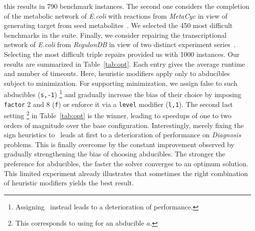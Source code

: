 this results in 790 benchmark instances.
The second one considers the completion of the metabolic network of \emph{E.coli} with reactions from \textit{MetaCyc} in view of generating target from seed metabolites~\cite{schthi09a}.
We selected the 450 most difficult benchmarks in the suite.
Finally, we consider repairing the transcriptional network of \emph{E.coli} from \textit{RegulonDB} in view of two distinct experiment series~\cite{geguivscsithve10a}.
Selecting the most difficult triple repairs provided us with 1000 instances.
%
Our results are summarized in Table~\ref{tab:opt}.
Each entry gives the average runtime and number of timeouts.
%
Here, heuristic modifiers apply only to abducibles subject to minimization.
%
For supporting minimization,
we assign false to such abducibles (\texttt{s,-1})%
\footnote{Assigning \true\ instead leads to a deterioration of performance.}
and gradually increase the bias of their choice by imposing \texttt{factor} 2 and 8 (\texttt{f})
or enforce it via a \texttt{level} modifier (\texttt{l,1}).
%
The second last setting%
\footnote{This corresponds to using  for an abducible $a$.}
in Table~\ref{tab:opt} is the winner, leading to speedups of one to two orders of magnitude over the base configuration.
Interestingly, merely fixing the sign heuristics to \false\ leads at first to a deterioration of performance on \textit{Diagnosis} problems.
This is finally overcome by the constant improvement observed by gradually strengthening the bias of choosing abducibles.
The stronger the preference for abducibles, the faster the solver converges to an optimum solution.
This limited experiment already illustrates that sometimes the right combination of heuristic
modifiers yields the best result.

